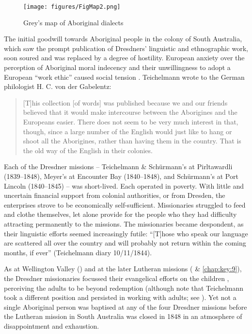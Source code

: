 \begin{figure}
\texttt{[image: figures/FigMap2.png]}
\caption{Grey's map of Aboriginal dialects \citeyearpar{grey_languages_1845}}
\label{fig:map2}
\centering
\end{figure} 


The initial goodwill towards Aboriginal people in the colony of South Australia, which saw the prompt publication of Dresdners' linguistic and ethnographic work, soon soured and was replaced by a degree of hostility. European anxiety over the perception of Aboriginal moral indecency and their unwillingness to adopt a European ``work ethic'' caused social tension \citep[94--95]{scrimgeour_colinizers_2007}. Teichelmann wrote to the German philologist H. C. von der Gabelentz:

\begin{quote}
    [T]his collection [of words] was published because we and our friends believed that it would make intercourse between the Aborigines and the Europeans easier. There does not seem to be very much interest in that, though, since a large number of the English would just like to hang or shoot all the Aborigines, rather than having them in the country. That is the old way of the English in their colonies. \citep{teichelmann_aboriginals_1841}
\end{quote}
 
Each of the Dresdner missions -- Teichelmann \& Schürmann’s at Pirltawardli (1839--1848), Meyer’s at Encounter Bay (1840--1848), and Schürmann’s at Port Lincoln (1840--1845) -- was short-lived. Each operated in poverty. With little and uncertain financial support from colonial authorities, or from Dresden, the enterprises strove to be economically self-sufficient. Missionaries struggled to feed and clothe themselves, let alone provide for the people who they had difficulty attracting permanently to the missions. The missionaries became despondent, as their linguistic efforts seemed increasingly futile: “[T]hose who speak our language are scattered all over the country and will probably not return within the coming months, if ever” (Teichelmann diary 10/11/1844).

As at Wellington Valley () and at the later Lutheran missions ( \& \ref{chap:key:9}), the Dresdner missionaries focussed their evangelical efforts on the children \citep[22]{gale_nothing_2011}, perceiving the adults to be beyond redemption (although note that Teichelmann took a different position and persisted in working with adults; see \citealt[12]{lockwood_vision_2007}). Yet not a single Aboriginal person was baptised at any of the four Dresdner missions before the Lutheran mission in South Australia was closed in 1848 in an atmosphere of disappointment and exhaustion.

